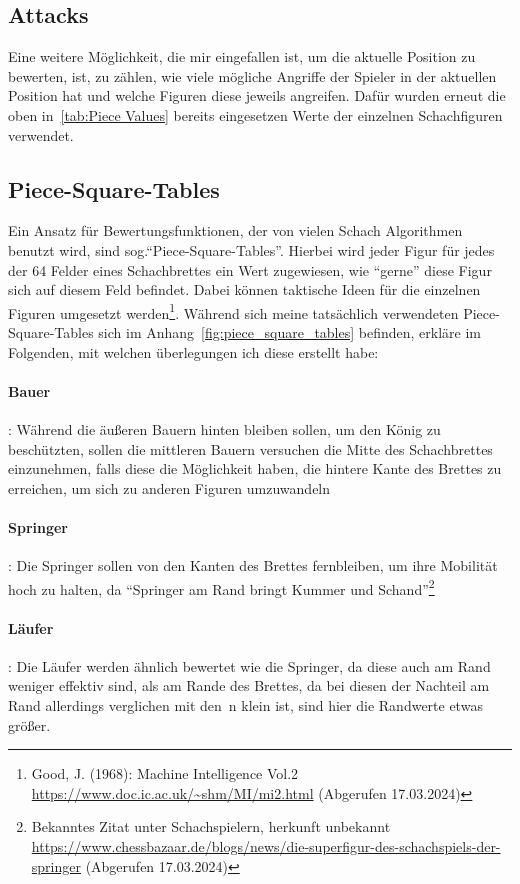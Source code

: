 \documentclass[12pt, a4paper, oneside, openright]{article}
\newcommand \sog{sog.\xspace }
\begin{document}
\subsection{Attacks}\label{subsec:attacks}
Eine weitere Möglichkeit, die mir eingefallen ist, um die aktuelle Position zu bewerten, ist, zu zählen, wie viele mögliche Angriffe der Spieler in der aktuellen Position hat und welche Figuren diese jeweils angreifen.
Dafür wurden erneut die oben in~\ref{tab:Piece Values} bereits eingesetzen Werte der einzelnen Schachfiguren verwendet.
\subsection{Piece-Square-Tables}\label{subsec:piece-tables}
Ein Ansatz für Bewertungsfunktionen, der von vielen Schach Algorithmen benutzt wird, sind \sog \enquote{Piece-Square-Tables}.
Hierbei wird jeder Figur für jedes der 64 Felder eines Schachbrettes ein Wert zugewiesen, wie \enquote{gerne} diese Figur sich auf diesem Feld befindet.
Dabei können taktische Ideen für die einzelnen Figuren umgesetzt werden\footnote{Good, J. (1968): Machine Intelligence Vol.2 \url{https://www.doc.ic.ac.uk/~shm/MI/mi2.html} (Abgerufen 17.03.2024)}.
Während sich meine tatsächlich verwendeten Piece-Square-Tables sich im Anhang~\ref{fig:piece_square_tables} befinden, erkläre im Folgenden, mit welchen überlegungen ich diese erstellt habe:
\paragraph{Bauer}:
Während die äußeren Bauern hinten bleiben sollen, um den König zu beschützten, sollen die mittleren Bauern  versuchen die Mitte des Schachbrettes einzunehmen, falls diese die Möglichkeit haben, die hintere Kante des Brettes zu erreichen, um sich zu anderen Figuren umzuwandeln
\paragraph{Springer}\label{par:springer}:
 Die Springer sollen von den Kanten des Brettes fernbleiben, um ihre Mobilität hoch zu halten, da \enquote{Springer am Rand bringt Kummer und Schand}\footnote{Bekanntes Zitat unter Schachspielern, herkunft unbekannt \url{https://www.chessbazaar.de/blogs/news/die-superfigur-des-schachspiels-der-springer} (Abgerufen 17.03.2024)}
\paragraph{Läufer}:
Die Läufer werden ähnlich bewertet wie die Springer, da diese auch am Rand weniger effektiv sind, als am Rande des Brettes, da bei diesen der Nachteil am Rand allerdings verglichen mit den~n klein ist, sind hier die Randwerte etwas größer.
\end{document}
